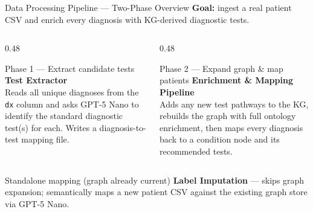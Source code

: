 \documentclass[aspectratio=169]{beamer}
\begin{document}
\begin{frame}{Data Processing Pipeline --- Two-Phase Overview}
  \textbf{Goal:} ingest a real patient CSV and enrich every diagnosis with
  KG-derived diagnostic tests.

  \vspace{0.5em}
  \begin{columns}[T]
    \begin{column}{0.48\textwidth}
      \begin{block}{Phase 1 --- Extract candidate tests}
        \textbf{Test Extractor}\\[0.3em]
        Reads all unique diagnoses from the \texttt{dx} column and asks
        GPT-5 Nano to identify the standard diagnostic test(s) for each.
        Writes a diagnosis-to-test mapping file.
      \end{block}
    \end{column}
    \begin{column}{0.48\textwidth}
      \begin{block}{Phase 2 --- Expand graph \& map patients}
        \textbf{Enrichment \& Mapping Pipeline}\\[0.3em]
        Adds any new test pathways to the KG, rebuilds the graph with full
        ontology enrichment, then maps every diagnosis back to a condition
        node and its recommended tests.
      \end{block}
    \end{column}
  \end{columns}

  \vspace{0.5em}
  \begin{block}{Standalone mapping (graph already current)}
    \textbf{Label Imputation} --- skips graph expansion; semantically maps a
    new patient CSV against the existing graph store via GPT-5 Nano.
  \end{block}
\end{frame}
\end{document}
